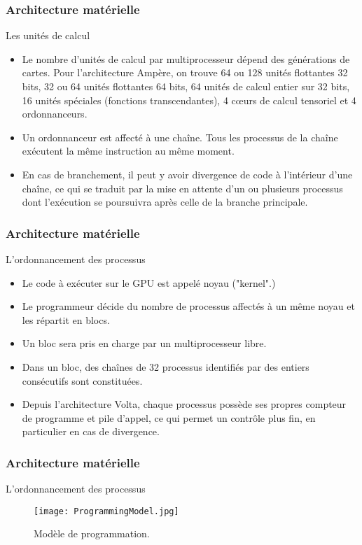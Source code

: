 \begin{frame}
    \frametitle{Architecture matérielle}
\begin{block}{Les unités de calcul}
   \begin{itemize}
    \item<+-> Le nombre d'unités de calcul par multiprocesseur dépend des générations de cartes. Pour l'architecture 
    Ampère, on trouve 64 ou 128 unités flottantes 32 bits, 32 ou 64 unités flottantes 64 bits, 64 unités de calcul entier
    sur 32 bits, 16 unités spéciales (fonctions transcendantes), 4 cœurs de calcul tensoriel et 4 ordonnanceurs.
    \item<+-> Un ordonnanceur est affecté à une chaîne. Tous les processus de la chaîne exécutent la même instruction
    au même moment.
    \item<+-> En cas de branchement, il peut y avoir divergence de code à l'intérieur d'une chaîne, ce qui se traduit par la 
    mise en attente d'un ou plusieurs processus dont l'exécution se poursuivra après celle de la branche principale. 
   \end{itemize} 
\end{block}
\end{frame}

\begin{frame}
    \frametitle{Architecture matérielle}
\begin{block}{L'ordonnancement des processus}
   \begin{itemize}
    \item<+-> Le code à exécuter sur le GPU est appelé noyau ("kernel".)
    \item<+-> Le programmeur décide du nombre de processus affectés à un même noyau et les répartit en blocs.
    \item<+-> Un bloc sera pris en charge par un multiprocesseur libre.
    \item<+-> Dans un bloc, des chaînes de 32 processus identifiés par des entiers consécutifs sont constituées. 
    \item<+-> Depuis l'architecture Volta, chaque processus possède ses propres compteur de programme et pile d'appel,
    ce qui permet un contrôle plus fin, en particulier en cas de divergence.
   \end{itemize} 
\end{block}
\end{frame}

\begin{frame}
    \frametitle{Architecture matérielle}
\begin{block}{L'ordonnancement des processus}
    \begin{figure}[htbp]
        \centering
         \texttt{[image: ProgrammingModel.jpg]} 
        \caption{Modèle de programmation.}
        \label{fig:programmingModel}
    \end{figure}
\end{block}
\end{frame}

